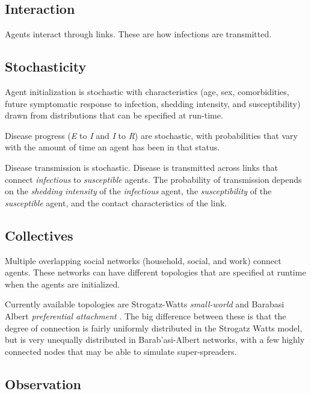 \documentclass[nofonts,]{tufte-handout}
\begin{document}
\hypertarget{interaction}{%
\subsection{Interaction}\label{interaction}}

Agents interact through links. These are how infections are transmitted.

\hypertarget{stochasticity}{%
\subsection{Stochasticity}\label{stochasticity}}

Agent initialization is stochastic with characteristics (age, sex,
comorbidities, future symptomatic response to infection, shedding
intensity, and susceptibility) drawn from distributions that can be
specified at run-time.

Disease progress (\emph{E} to \emph{I} and \emph{I} to \emph{R}) are
stochastic, with probabilities that vary with the amount of time an
agent has been in that status.

Disease transmission is stochastic. Disease is transmitted across links
that connect \emph{infectious} to \emph{susceptible} agents. The
probability of transmission depends on the \emph{shedding intensity} of
the \emph{infectious} agent, the \emph{susceptibility} of the
\emph{susceptible} agent, and the contact characteristics of the link.

\hypertarget{collectives}{%
\subsection{Collectives}\label{collectives}}

Multiple overlapping social networks (household, social, and work)
connect agents. These networks can have different topologies that are
specified at runtime when the agents are initialized.

Currently available topologies are Strogatz-Watts \emph{small-world}
\citep{watts:collective.dynamics:1998} and Barabasi Albert
\emph{preferential attachment}
\citep{albert:statistical.mechanics:2002, barabasi:emergence.scaling:1999}.
The big difference between these is that the degree of connection is
fairly uniformly distributed in the Strogatz Watts model, but is very
unequally distributed in Barab'asi-Albert networks, with a few highly
connected nodes that may be able to simulate super-spreaders.

\hypertarget{observation}{%
\subsection{Observation}\label{observation}}
\end{document}
